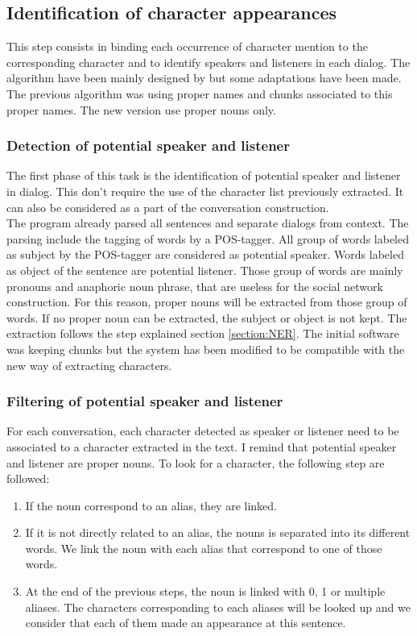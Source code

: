 \documentclass[a4paper, 12pt]{report}
\begin{document}
\subsection{Identification of character appearances}
\label{identification}
This step consists in binding each occurrence of character mention to the corresponding character and to identify speakers and listeners in each dialog. The algorithm have been mainly designed by \cite{original_thesis} but some adaptations have been made. The previous algorithm was using proper names and chunks associated to this proper names. The new version use proper nouns only.\\

\subsubsection{Detection of potential speaker and listener}
The first phase of this task is the identification of potential speaker and listener in dialog. This don't require the use of the character list previously extracted. It can also be considered as a part of the conversation construction.\\

The program already parsed all sentences and separate dialogs from context. The parsing include the tagging of words by a POS-tagger. All group of words labeled as subject by the POS-tagger are considered as potential speaker. Words labeled as object of the sentence are potential listener. Those group of words are mainly pronouns and anaphoric noun phrase, that are useless for the social network construction. For this reason, proper nouns will be extracted from those group of words. If no proper noun can be extracted, the subject or object is not kept. The extraction follows the step explained section \ref{section:NER}. The initial software was keeping chunks but the system has been modified to be compatible with the new way of extracting characters.

\subsubsection{Filtering of potential speaker and listener}
\label{filtering}
For each conversation, each character detected as speaker or listener need to be associated to a character extracted in the text. I remind that potential speaker and listener are proper nouns. To look for a character, the following step are followed:\\
\begin{enumerate}
\item If the noun correspond to an alias, they are linked.
\item If it is not directly related to an alias, the nouns is separated into its different words. We link the noun with each alias that correspond to one of those words.
\item At the end of the previous steps, the noun is linked with 0, 1 or multiple aliases. The characters corresponding to each aliases will be looked up and we consider that each of them made an appearance at  this sentence.
\end{enumerate}
\end{document}
